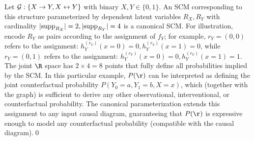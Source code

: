 \begin{example}
\label{ex:bow}
Let $\mathcal{G}:\{X \rightarrow Y, X \leftrightarrow Y\}$ with binary $X,Y \in \{0,1\}$. An SCM corresponding to this structure parameterized by dependent latent variables $R_X,R_Y$ with cardinality $|\mathrm{supp}_{R_X}| = 2, |\mathrm{supp}_{R_Y}| = 4$ is a canonical SCM. For illustration, encode $R_Y$ as pairs according to the assignment of $f_Y$; for example, $r_Y=(0,0)$ refers to the assignment: $h_Y^{(r_Y)}(x=0)=0, h_Y^{(r_Y)}(x=1)=0$, while $r_Y=(0,1)$ refers to the assignment: $h_Y^{(r_Y)}(x=0)=0, h_Y^{(r_Y)}(x=1)=1$. The joint $\R$ space has $2\times 4=8$ points that fully define all probabilities implied by the SCM. In this particular example, $P(\r)$ can be interpreted as defining the joint counterfactual probability $P(Y_0{=}a, Y_1{=}b, X{=}x)$, which (together with the graph) is sufficient to derive any other observational, interventional, or counterfactual probability. The canonical parameterization extends this assignment to any input causal diagram, guaranteeing that $P(\r)$ is expressive enough to model any counterfactual probability (compatible with the causal diagram).\qed


\end{example}

